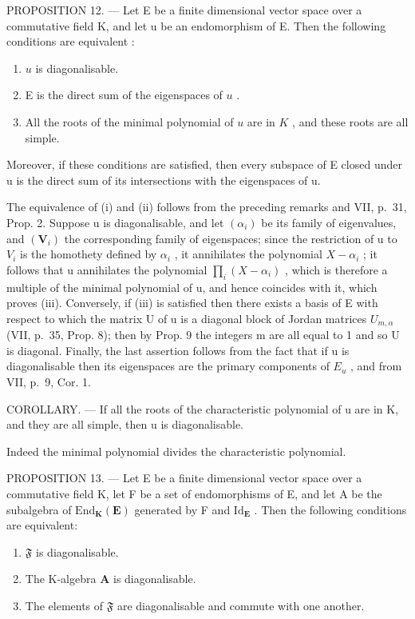 PROPOSITION 12. --- Let E be a finite dimensional vector space over a commutative field K, and let u be an endomorphism of E. Then the following conditions are equivalent :

\begin{enumerate}
\def\labelenumi{(\roman{enumi})}
\item
  \(u\) is diagonalisable.
\item
  E is the direct sum of the eigenspaces of \(u\) .
\item
  All the roots of the minimal polynomial of \(u\) are in \(K\) , and these roots are all simple.
\end{enumerate}

Moreover, if these conditions are satisfied, then every subspace of E closed under u is the direct sum of its intersections with the eigenspaces of u.

The equivalence of (i) and (ii) follows from the preceding remarks and VII, p.~31, Prop. 2. Suppose u is diagonalisable, and let \((\alpha_{i})\) be its family of eigenvalues, and \((\mathbf{V}_{i})\) the corresponding family of eigenspaces; since the restriction of u to \(V_{i}\) is the homothety defined by \(\alpha_{i}\) , it annihilates the polynomial \(X - \alpha_{i}\) ; it follows that u annihilates the polynomial \(\prod_{i}(X - \alpha_{i})\) , which is therefore a multiple of the minimal polynomial of u, and hence coincides with it, which proves (iii). Conversely, if (iii) is satisfied then there exists a basis of E with respect to which the matrix U of u is a diagonal block of Jordan matrices \(U_{m,\alpha}\) (VII, p.~35, Prop. 8); then by Prop. 9 the integers m are all equal to 1 and so U is diagonal. Finally, the last assertion follows from the fact that if u is diagonalisable then its eigenspaces are the primary components of \(E_{u}\) , and from VII, p.~9, Cor. 1.

COROLLARY. --- If all the roots of the characteristic polynomial of u are in K, and they are all simple, then u is diagonalisable.

Indeed the minimal polynomial divides the characteristic polynomial.

PROPOSITION 13. --- Let E be a finite dimensional vector space over a commutative field K, let F be a set of endomorphisms of E, and let A be the subalgebra of \(\mathrm{End}_{\mathbf{K}}(\mathbf{E})\) generated by F and \(\mathrm{Id}_{\mathbf{E}}\) . Then the following conditions are equivalent:

\begin{enumerate}
\def\labelenumi{(\roman{enumi})}
\item
  \(\mathfrak{F}\) is diagonalisable.
\item
  The K-algebra \(\mathbf{A}\) is diagonalisable.
\item
  The elements of \(\mathfrak{F}\) are diagonalisable and commute with one another.
\end{enumerate}

